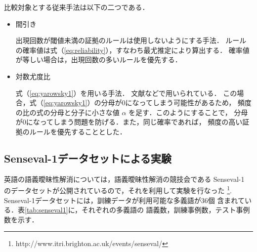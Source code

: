 比較対象とする従来手法は以下の二つである．

\begin{itemize}
\item 間引き

出現回数が閾値未満の証拠のルールは使用しないようにする手法．
ルールの確率値は式（\ref{eq:reliability}），すなわち最尤推定により算出する．
確率値が等しい場合は，出現回数の多いルールを優先する．

\item 対数尤度比

式（\ref{eq:yarowsky1}）を用いる手法．
文献\cite{Yarowsky:Decision}\cite{新納:複合語}などで用いられている．
この場合，式（\ref{eq:yarowsky1}）の分母が0になってしまう可能性があるため，
頻度の比の式の分母と分子に小さな値 $\alpha$ を足す．このようにすることで，
分母が0になってしまう問題を防げる．また，同じ確率であれば，
頻度の高い証拠のルールを優先することとした．

\end{itemize}

\subsection{Senseval-1データセットによる実験}

英語の語義曖昧性解消については，語義曖昧性解消の競技会である Senseval-1
のデータセットが公開されているので，それを利用して実験を行なった
\footnote{http://www.itri.brighton.ac.uk/events/senseval/}. 
Senseval-1データセットには，訓練データが利用可能な多義語が36個
含まれている．表\ref{tab:senseval1}に，それぞれの多義語の
語義数，訓練事例数，テスト事例数を示す．

